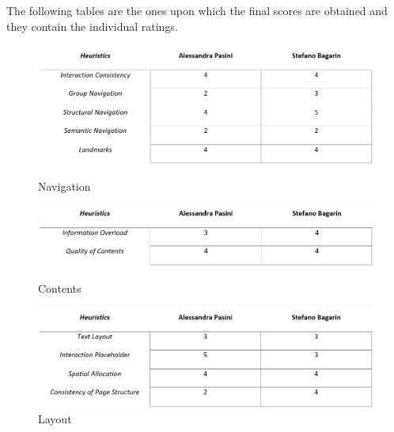 The following tables are the ones upon which the final scores are obtained and they contain the individual ratings.

\begin{figure}[h!]
	\centering
 	 \begin{minipage}[b]{1\textwidth}
    		\includegraphics[width=\textwidth]{./assets/navigation.png}
    		\caption{Navigation}
  	\end{minipage}
	\hfill
	\vspace{1cm}
 	\begin{minipage}[b]{1\textwidth}
    		\includegraphics[width=\textwidth]{./assets/contents.png}
    		\caption{Contents}
	\end{minipage}
	\hfill
	\vspace{1cm}
	\begin{minipage}[b]{1\textwidth}
    		\includegraphics[width=\textwidth]{./assets/layout.png}
    		\caption{Layout}
	\end{minipage}
\end{figure}
\FloatBarrier

